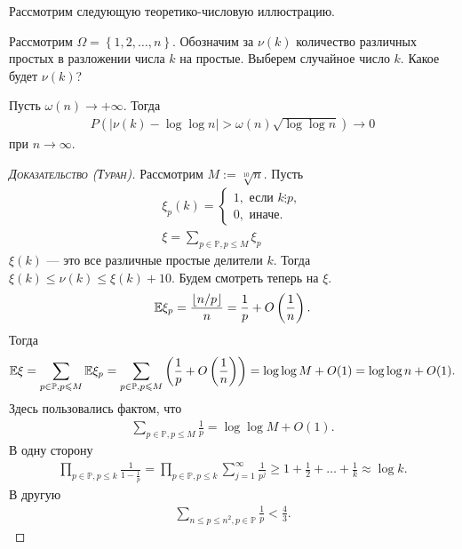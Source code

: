 \documentclass[../main.tex]{subfiles}
\begin{document}
Рассмотрим следующую теоретико-числовую иллюстрацию.

\begin{exmpl}[]
 Рассмотрим $ \Omega = \left\{ 1,2,\ldots,n \right\} $. Обозначим за $ \nu(k) $ количество различных простых в разложении числа $ k $ на простые. Выберем случайное число $ k $. Какое будет $ \nu(k) $?
\end{exmpl}
\begin{thm}
 Пусть $ \omega(n) \to +\infty $. Тогда
 \begin{align*}
  P( \left| \nu(k) - \log\log n \right| > \omega(n) \sqrt{\log\log n}) \to 0
 \end{align*}  при $ n \to \infty $.
\end{thm}
\begin{proof}[\normalfont\textsc{Доказательство (Туран)}]
 Рассмотрим $ M := \sqrt[10] n $. Пусть
 \begin{align*}
  \xi_p(k) = \begin{cases}
   1, \text{ если } k \vdots p, \\
   0, \text{ иначе. }
  \end{cases} \\
  \xi = \sum_{p \in \mathbb P, p \leqslant M} \xi_p
 \end{align*} $ \xi(k) $ --- это все различные простые делители $ k $. Тогда $ \xi(k) \leqslant \nu(k) \leqslant \xi(k) + 10$. Будем смотреть теперь на $ \xi $.
 \begin{align*}
  \mathbb E\xi_p = \frac{\left\lfloor n / p \right\rfloor }{n} = \frac{1}{p} + O\left(\frac{1}{n}\right).
 \end{align*} Тогда
 \begin{align*}
  \mathbb E\xi = \sum_{p \in \mathbb P, p \leqslant M} \mathbb E\xi_p = \sum_{p \in \mathbb P, p \leqslant M}\left(\frac{1}{p} + O \left( \frac{1}{n} \right) \right) = \log\log M + O(1) = \log\log n + O(1).
 \end{align*} Здесь пользовались фактом, что
 \begin{align*}
  \sum_{p \in \mathbb P, p \leqslant M}  \frac{1}{p} = \log \log M + O(1).
 \end{align*}
 В одну сторону
 \begin{align*}
  \prod_{p \in \mathbb P, p \leqslant k} \frac{1}{1 - \frac{1}{p}} = \prod_{p \in \mathbb P, p \leqslant k} \sum_{j=1}^{\infty} \frac{1}{p^{j}} \geqslant 1 + \frac{1}{2} + \ldots + \frac{1}{k} \approx \log k.
 \end{align*} В другую
 \begin{align*}
  \sum_{n \leqslant p \leqslant n^{2}, p \in \mathbb P} \frac{1}{p} < \frac{4}{3}.
 \end{align*} 


\end{proof}
\end{document}
